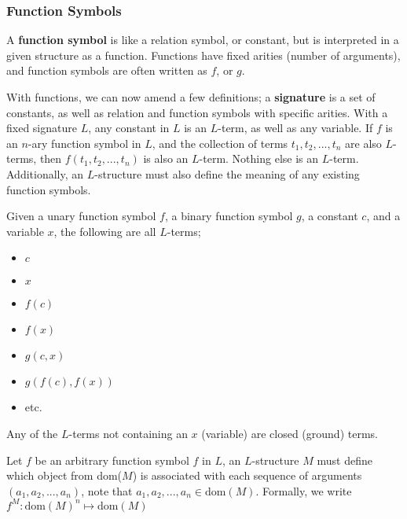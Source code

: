 \documentclass[a4paper, 12pt]{article}
\begin{document}
            \subsubsection*{Function Symbols}
                A \textbf{function symbol} is like a relation symbol, or constant, but is interpreted in a given structure as a function. Functions have fixed arities (number of arguments), and function symbols are often written as $f$, or $g$.
                \medskip

                With functions, we can now amend a few definitions; a \textbf{signature} is a set of constants, as well as relation and function symbols with specific arities. With a fixed signature $L$, any constant in $L$ is an $L$-term, as well as any variable. If $f$ is an $n$-ary function symbol in $L$, and the collection of terms $t_1, t_2, ..., t_n$ are also $L$-terms, then $f(t_1, t_2, ..., t_n)$ is also an $L$-term. Nothing else is an $L$-term. Additionally, an $L$-structure must also define the meaning of any existing function symbols.
                \medskip

                Given a unary function symbol $f$, a binary function symbol $g$, a constant $c$, and a variable $x$, the following are all $L$-terms;
                \begin{itemize}
                    \itemsep0em
                    \item $c$
                    \item $x$
                    \item $f(c)$
                    \item $f(x)$
                    \item $g(c, x)$
                    \item $g(f(c), f(x))$
                    \item etc.
                \end{itemize}
                Any of the $L$-terms not containing an $x$ (variable) are closed (ground) terms.
                \medskip

                Let $f$ be an arbitrary function symbol $f$ in $L$, an $L$-structure $M$ must define which object from dom($M$) is associated with each sequence of arguments $(a_1, a_2, ..., a_n)$, note that $a_1, a_2, ..., a_n \in \text{dom}(M)$. Formally, we write $f^M: \text{dom}(M)^n \mapsto \text{dom}(M)$
                \medskip
\end{document}
